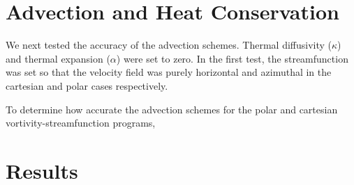 \documentclass{article}
\begin{document}
\section*{Advection and Heat Conservation}
We next tested the accuracy of the advection schemes. Thermal diffusivity ($\kappa$) and thermal expansion ($\alpha$) were set to zero. In the first test, the streamfunction was set so that the velocity field was purely horizontal and azimuthal in the cartesian and polar cases respectively. 






To determine how accurate the advection schemes for the polar and cartesian vortivity-streamfunction programs, 


\section*{Results}

\section*{}
\end{document}

